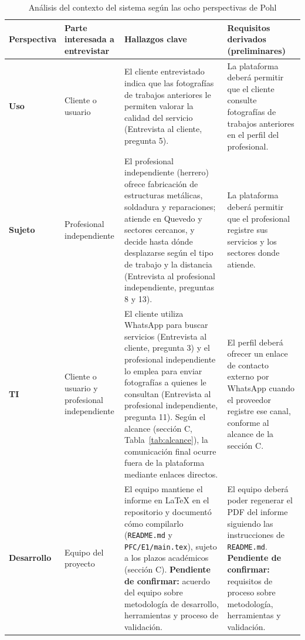 \documentclass[11pt,a4paper]{article}
\renewcommand{\arraystretch}{1.22}
\begin{document}
\begin{table}[H]
\centering
\caption{An\'alisis del contexto del sistema seg\'un las ocho perspectivas de Pohl}
\label{tab:perspectivas}
\footnotesize
\renewcommand{\arraystretch}{1.15}
\begin{tabularx}{\textwidth}{|L{2.05cm}|L{2.55cm}|>{\hsize}Y|>{\hsize}Y|}
\hline
{}
\textbf{Perspectiva} & \textbf{Parte interesada a entrevistar} & \textbf{Hallazgos clave} & \textbf{Requisitos derivados (preliminares)} \\
\hline
\textbf{Uso} & Cliente o usuario & El cliente entrevistado indica que las fotograf\'ias de trabajos anteriores le permiten valorar la calidad del servicio (Entrevista al cliente, pregunta 5). & La plataforma deber\'a permitir que el cliente consulte fotograf\'ias de trabajos anteriores en el perfil del profesional. \\
\hline
\textbf{Sujeto} & Profesional independiente & El profesional independiente (herrero) ofrece fabricaci\'on de estructuras met\'alicas, soldadura y reparaciones; atiende en Quevedo y sectores cercanos, y decide hasta d\'onde desplazarse seg\'un el tipo de trabajo y la distancia (Entrevista al profesional independiente, preguntas 8 y 13). & La plataforma deber\'a permitir que el profesional registre sus servicios y los sectores donde atiende. \\
\hline
\textbf{TI} & Cliente o usuario y profesional independiente & El cliente utiliza WhatsApp para buscar servicios (Entrevista al cliente, pregunta 3) y el profesional independiente lo emplea para enviar fotograf\'ias a quienes le consultan (Entrevista al profesional independiente, pregunta 11). Seg\'un el alcance (secci\'on C, Tabla~\ref{tab:alcance}), la comunicaci\'on final ocurre fuera de la plataforma mediante enlaces directos. & El perfil deber\'a ofrecer un enlace de contacto externo por WhatsApp cuando el proveedor registre ese canal, conforme al alcance de la secci\'on C. \\
\hline
\textbf{Desarrollo} & Equipo del proyecto & El equipo mantiene el informe en \LaTeX{} en el repositorio y document\'o c\'omo compilarlo (\texttt{README.md} y \texttt{PFC/E1/main.tex}), sujeto a los plazos acad\'emicos (secci\'on C). \textbf{Pendiente de confirmar:} acuerdo del equipo sobre metodolog\'ia de desarrollo, herramientas y proceso de validaci\'on. & El equipo deber\'a poder regenerar el PDF del informe siguiendo las instrucciones de \texttt{README.md}. \textbf{Pendiente de confirmar:} requisitos de proceso sobre metodolog\'ia, herramientas y validaci\'on. \\

\end{tabularx}
\end{table}
\end{document}
